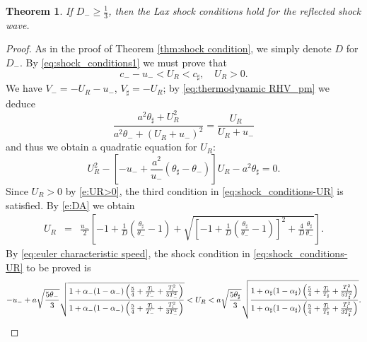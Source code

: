\documentclass[10pt,a4paper]{article}
\newtheorem{theorem}{Theorem}[section]
\numberwithin{equation}{section}
\newcommand{\Ti}{T_{\rm i}}
\begin{document}
\begin{theorem}\label{thm:shock condition_reflection}
If $D_-\ge\frac13$, then the Lax shock conditions hold for the reflected shock wave.
\end{theorem}

\begin{proof}
As in the proof of Theorem \ref{thm:shock condition}, we simply denote $D$ for $D_-$. By \eqref{eq:shock_conditions1} we must prove that 
\begin{equation}\label{eq:shock_conditions-UR}
     c_--u_-< U_R < c_\sharp, \quad  U_R>0.
\end{equation}
We have $	V_- =- U_R - u_-$, $V_\sharp = - U_R$; 
%
by \eqref{eq:thermodynamic RHV_pm} we deduce
\begin{equation}\label{e:UR>0}
 \frac{a^2\theta_\sharp + U_R^2}{a^2\theta_- + (U_R + u_-)^2}   = \frac{U_R}{U_R + u_-}
\end{equation}
and thus we obtain a quadratic equation for $U_R$:
$$
  U_R^2 -\left[- u_- + \frac{a^2}{u_- }(\theta_\sharp - \theta_-)\right]U_R - a^2\theta_\sharp= 0.
$$
Since $U_R > 0$ by \eqref{e:UR>0}, the third condition in \eqref{eq:shock_conditions-UR} is satisfied.  By \eqref{e:DA} we obtain
\begin{eqnarray}
U_R &=&
\frac{u_-}{2}\left[{\textstyle - 1 + \frac{1}{D}\left(\frac{\theta_\sharp}{\theta_-} - 1\right) + \sqrt{\left[- 1 + \frac{1}{D}\left(\frac{\theta_\sharp}{\theta_-} - 1\right)\right]^{\! 2} + {\textstyle \frac{4}{D}\frac{\theta_\sharp}{\theta_-}}}}\right].
\label{eq:U_R}
\end{eqnarray}
By \eqref{eq:euler characteristic speed}, the shock condition in \eqref{eq:shock_conditions-UR} to be proved is
\begin{equation}\label{eq:shock condition_R}
-u_- + a\sqrt{\frac{5\theta_-}{3}}\sqrt{\frac{1 + \alpha_-(1 - \alpha_-)\left(\frac{5}{4} + \frac{\Ti}{T_-} + \frac{\Ti^2}{5T_-^2}\right)}{1 + \alpha_-(1 - \alpha_-)\left(\frac{5}{4} + \frac{\Ti}{T_-} + \frac{\Ti^2}{3T_-^2}\right)}}  
<
U_R 
<
a\sqrt{\frac{5\theta_\sharp}{3}}\sqrt{\frac{1 + \alpha_\sharp(1 - \alpha_\sharp)\left(\frac{5}{4} + \frac{\Ti}{T_\sharp} + \frac{\Ti^2}{5T_\sharp^2}\right)}{1 + \alpha_\sharp(1 - \alpha_\sharp)\left(\frac{5}{4} + \frac{\Ti}{T_\sharp} + \frac{\Ti^2}{3T_\sharp^2}\right)}}.

\end{equation}
\end{proof}
\end{document}
